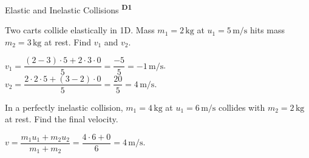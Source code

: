 ﻿\documentclass[12pt,a4paper]{article}
\providecommand{\KPProblems}{}
\newcommand{\DOne}{\texorpdfstring{\textsuperscript{\textbf{D1}}}{ D1}}
\begin{document}
\begin{KnowledgePoint}{Elastic and Inelastic Collisions \DOne}
  \KPProblems
\begin{cheatproblem}
  Two carts collide elastically in 1D. Mass $m_1=2\,\text{kg}$ at $u_1=5\,\text{m/s}$ hits mass $m_2=3\,\text{kg}$ at rest. Find $v_1$ and $v_2$.
\begin{solutionbox}
  $v_1=\dfrac{(2-3)\cdot5+2\cdot3\cdot0}{5}=\dfrac{-5}{5}=-1\,\text{m/s}$. $v_2=\dfrac{2\cdot2\cdot5+(3-2)\cdot0}{5}=\dfrac{20}{5}=4\,\text{m/s}$.
\end{solutionbox}
\end{cheatproblem}
\begin{cheatproblem}
  In a perfectly inelastic collision, $m_1=4\,\text{kg}$ at $u_1=6\,\text{m/s}$ collides with $m_2=2\,\text{kg}$ at rest. Find the final velocity.
\begin{solutionbox}
  $v=\dfrac{m_1u_1+m_2u_2}{m_1+m_2}=\dfrac{4\cdot6+0}{6}=4\,\text{m/s}$.
\end{solutionbox}
\end{cheatproblem}
\end{KnowledgePoint}
\end{document}
